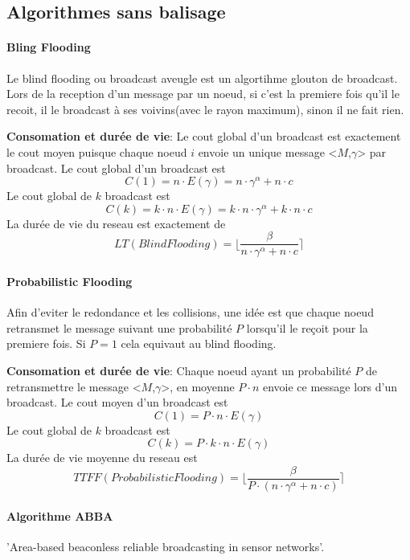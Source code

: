 \subsection{Algorithmes sans balisage}

\paragraph{Bling Flooding}

Le blind flooding ou broadcast aveugle est un algortihme glouton de broadcast. Lors de la reception d'un message par un noeud, si c'est la premiere fois qu'il le recoit, il le broadcast à ses voivins(avec le rayon maximum), sinon il
 ne fait rien.

\textbf{Consomation et durée de vie}: Le cout global d'un broadcast est exactement le cout moyen puisque chaque noeud $i$ envoie un unique message <$M$,$\gamma$> par broadcast.
Le cout global d'un broadcast est $$C(1) = n \cdot E( \gamma )= n\cdot \gamma^\alpha +  n\cdot c $$
Le cout global de $k$ broadcast est $$C(k) = k\cdot n \cdot E( \gamma )= k\cdot n \cdot \gamma^\alpha +  k \cdot n\cdot c $$
La durée de vie du reseau est exactement de $$LT(Blind Flooding)=\lfloor \frac{\beta}{n\cdot \gamma^\alpha +  n\cdot c} \rceil$$
\paragraph{Probabilistic Flooding}

Afin d'eviter le redondance et les collisions, une idée est que chaque noeud retransmet le message suivant une probabilité $P$ lorsqu'il le reçoit pour la premiere fois.
Si $P=1$ cela equivaut au blind flooding.

\textbf{Consomation et durée de vie}: Chaque noeud ayant un probabilité $P$ de retransmettre le message <$M$,$\gamma$>, en moyenne $P\cdot n$ envoie ce message lors d'un broadcast.
Le cout moyen d'un broadcast est $$C(1) = P\cdot n \cdot E( \gamma ) $$
Le cout global de $k$ broadcast est $$C(k) = P\cdot k\cdot n \cdot E( \gamma ) $$
La durée de vie moyenne du reseau est  $$TTFF(Probabilistic Flooding)=\lfloor \frac{\beta}{P \cdot (n\cdot \gamma^\alpha +  n\cdot c)} \rceil$$



\paragraph{Algorithme ABBA}
'Area-based beaconless reliable broadcasting in
sensor networks'\cite{Abba2006}.


